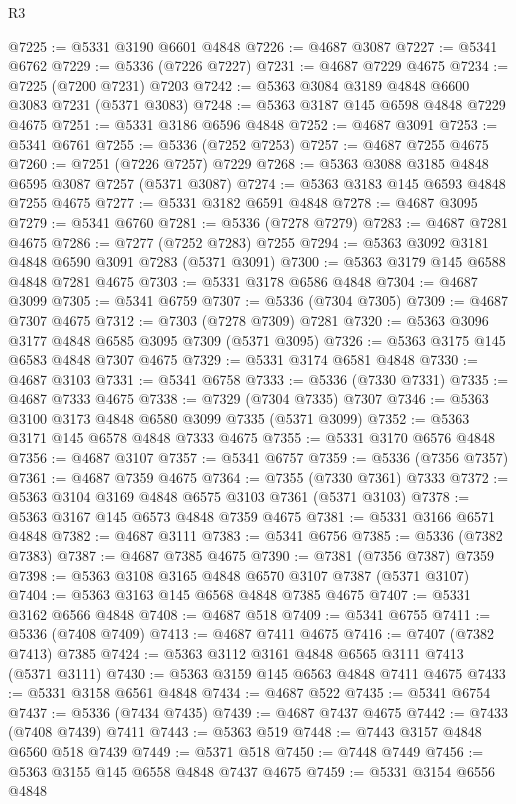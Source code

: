 \begin{lexlean}{R3}
\begin{coremodule}
@7225 := @5331 @3190 @6601 @4848
@7226 := @4687 @3087
@7227 := @5341 @6762
@7229 := @5336 (@7226 @7227)
@7231 := @4687 @7229 @4675
@7234 := @7225 (@7200 @7231) @7203
@7242 := @5363 @3084 @3189 @4848 @6600 @3083 @7231 (@5371 @3083)
@7248 := @5363 @3187 @145 @6598 @4848 @7229 @4675
@7251 := @5331 @3186 @6596 @4848
@7252 := @4687 @3091
@7253 := @5341 @6761
@7255 := @5336 (@7252 @7253)
@7257 := @4687 @7255 @4675
@7260 := @7251 (@7226 @7257) @7229
@7268 := @5363 @3088 @3185 @4848 @6595 @3087 @7257 (@5371 @3087)
@7274 := @5363 @3183 @145 @6593 @4848 @7255 @4675
@7277 := @5331 @3182 @6591 @4848
@7278 := @4687 @3095
@7279 := @5341 @6760
@7281 := @5336 (@7278 @7279)
@7283 := @4687 @7281 @4675
@7286 := @7277 (@7252 @7283) @7255
@7294 := @5363 @3092 @3181 @4848 @6590 @3091 @7283 (@5371 @3091)
@7300 := @5363 @3179 @145 @6588 @4848 @7281 @4675
@7303 := @5331 @3178 @6586 @4848
@7304 := @4687 @3099
@7305 := @5341 @6759
@7307 := @5336 (@7304 @7305)
@7309 := @4687 @7307 @4675
@7312 := @7303 (@7278 @7309) @7281
@7320 := @5363 @3096 @3177 @4848 @6585 @3095 @7309 (@5371 @3095)
@7326 := @5363 @3175 @145 @6583 @4848 @7307 @4675
@7329 := @5331 @3174 @6581 @4848
@7330 := @4687 @3103
@7331 := @5341 @6758
@7333 := @5336 (@7330 @7331)
@7335 := @4687 @7333 @4675
@7338 := @7329 (@7304 @7335) @7307
@7346 := @5363 @3100 @3173 @4848 @6580 @3099 @7335 (@5371 @3099)
@7352 := @5363 @3171 @145 @6578 @4848 @7333 @4675
@7355 := @5331 @3170 @6576 @4848
@7356 := @4687 @3107
@7357 := @5341 @6757
@7359 := @5336 (@7356 @7357)
@7361 := @4687 @7359 @4675
@7364 := @7355 (@7330 @7361) @7333
@7372 := @5363 @3104 @3169 @4848 @6575 @3103 @7361 (@5371 @3103)
@7378 := @5363 @3167 @145 @6573 @4848 @7359 @4675
@7381 := @5331 @3166 @6571 @4848
@7382 := @4687 @3111
@7383 := @5341 @6756
@7385 := @5336 (@7382 @7383)
@7387 := @4687 @7385 @4675
@7390 := @7381 (@7356 @7387) @7359
@7398 := @5363 @3108 @3165 @4848 @6570 @3107 @7387 (@5371 @3107)
@7404 := @5363 @3163 @145 @6568 @4848 @7385 @4675
@7407 := @5331 @3162 @6566 @4848
@7408 := @4687 @518
@7409 := @5341 @6755
@7411 := @5336 (@7408 @7409)
@7413 := @4687 @7411 @4675
@7416 := @7407 (@7382 @7413) @7385
@7424 := @5363 @3112 @3161 @4848 @6565 @3111 @7413 (@5371 @3111)
@7430 := @5363 @3159 @145 @6563 @4848 @7411 @4675
@7433 := @5331 @3158 @6561 @4848
@7434 := @4687 @522
@7435 := @5341 @6754
@7437 := @5336 (@7434 @7435)
@7439 := @4687 @7437 @4675
@7442 := @7433 (@7408 @7439) @7411
@7443 := @5363 @519
@7448 := @7443 @3157 @4848 @6560 @518 @7439
@7449 := @5371 @518
@7450 := @7448 @7449
@7456 := @5363 @3155 @145 @6558 @4848 @7437 @4675
@7459 := @5331 @3154 @6556 @4848

\end{coremodule}
\end{lexlean}
